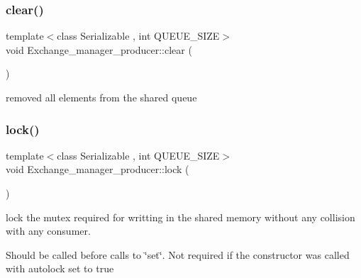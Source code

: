 \subsubsection{\texorpdfstring{clear()}{clear()}}
{\footnotesize\ttfamily template$<$class Serializable , int Q\+U\+E\+U\+E\+\_\+\+S\+I\+ZE$>$ \\
void Exchange\+\_\+manager\+\_\+producer\+::clear (\begin{DoxyParamCaption}{ }\end{DoxyParamCaption})}



removed all elements from the shared queue 

\mbox{\label{classshared__memory_1_1Exchange__manager__producer_aa39c8b921eeff081111c756bd6d2ca3d}} 
\subsubsection{\texorpdfstring{lock()}{lock()}}
{\footnotesize\ttfamily template$<$class Serializable , int Q\+U\+E\+U\+E\+\_\+\+S\+I\+ZE$>$ \\
void Exchange\+\_\+manager\+\_\+producer\+::lock (\begin{DoxyParamCaption}{ }\end{DoxyParamCaption})}



lock the mutex required for writting in the shared memory without any collision with any consumer. 

Should be called before calls to \char`\"{}set\char`\"{}. Not required if the constructor was called with autolock set to true \mbox{\label{classshared__memory_1_1Exchange__manager__producer_ab31e6b87ad4c856736dec15486ed4489}} 
